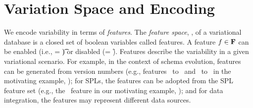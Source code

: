 \section{Variation Space and Encoding}
\label{sec:varspace}



We encode variability in terms of \emph{features}.
%
The \emph{feature space}, \fSet, of a variational database
is a closed set of boolean variables called features.
%
A feature \ensuremath{\fName \in \fSet} can be enabled (i.e., \fName = \t) or disabled (\fName = \f).
Features describe the variability in a given variational scenario.
%
%
For example, in the context of schema evolution, features can be generated from version 
numbers (e.g., features \vOne\ to \vFive\ and \tOne\ to \tFive\ in the 
motivating example, ); for SPLs, 
the features can be adopted from the SPL feature set (e.g., the \edu\ feature in
our motivating example, ); and 
for data integration, the features may represent different data sources.  

